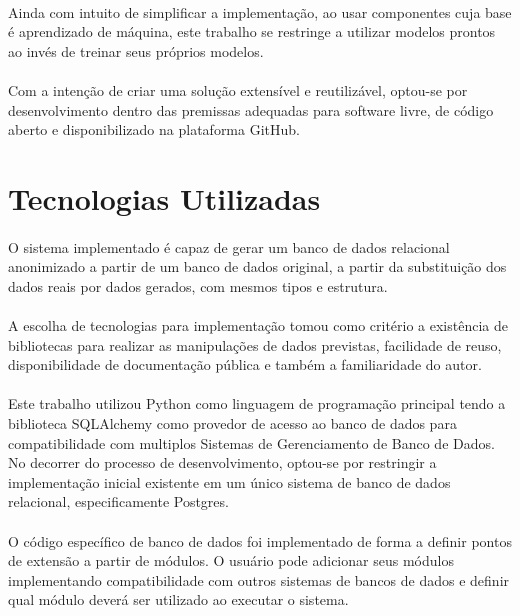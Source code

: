 \paragraph{} Ainda com intuito de simplificar a implementação, ao usar componentes cuja base é aprendizado de máquina, este trabalho se restringe a utilizar modelos prontos ao invés de treinar seus próprios modelos.

\paragraph{} Com a intenção de criar uma solução extensível e reutilizável, optou-se por desenvolvimento dentro das premissas adequadas para software livre, de código aberto e disponibilizado na plataforma GitHub.

\section{Tecnologias Utilizadas}

\paragraph{} O sistema implementado é capaz de gerar um banco de dados relacional anonimizado a partir de um banco de dados original, a partir da substituição dos dados reais por dados gerados, com mesmos tipos e estrutura.

\paragraph{} A escolha de tecnologias para implementação tomou como critério a existência de bibliotecas para realizar as manipulações de dados previstas, facilidade de reuso, disponibilidade de documentação pública e também a familiaridade do autor.

\paragraph{} Este trabalho utilizou Python como linguagem de programação principal tendo a biblioteca SQLAlchemy como provedor de acesso ao banco de dados para compatibilidade com multiplos Sistemas de Gerenciamento de Banco de Dados. No decorrer do processo de desenvolvimento, optou-se por restringir a implementação inicial existente em um único sistema de banco de dados relacional, especificamente Postgres.

\paragraph{} O código específico de banco de dados foi implementado de forma a definir pontos de extensão a partir de módulos. O usuário pode adicionar seus módulos implementando compatibilidade com outros sistemas de bancos de dados e definir qual módulo deverá ser utilizado ao executar o sistema.


